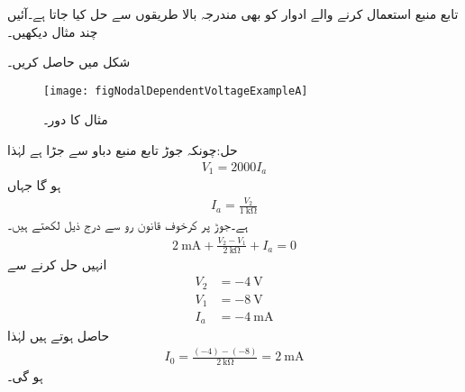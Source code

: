 تابع  منبع استعمال کرنے والے ادوار کو بھی مندرجہ بالا طریقوں سے حل کیا جاتا ہے۔آئیں چند مثال دیکھیں۔

شکل  میں  حاصل کریں۔
\begin{figure}
\centering
\texttt{[image: figNodalDependentVoltageExampleA]}
\caption{مثال  کا دور۔}
\label{شکل_جوڑ_مثال_تابع_منبع_دباو_الف}
\end{figure}

حل:چونکہ جوڑ  تابع منبع دباو سے جڑا ہے لہٰذا
\begin{align*}
V_1=2000 I_a
\end{align*}
ہو گا جہاں
\begin{align*}
I_a=\frac{V_2}{\SI{1}{\kilo\ohm}}
\end{align*}
ہے۔جوڑ  پر کرخوف قانون رو سے درج ذیل لکھتے ہیں۔
\begin{align*}
\SI{2}{\milli\ampere}+\frac{V_2-V_1}{\SI{2}{\kilo\ohm}}+I_a=0
\end{align*}
انہیں حل کرنے سے
\begin{align*}
V_2&=\SI{-4}{\volt}\\
V_1&=\SI{-8}{\volt}\\
I_a&=\SI{-4}{\milli\ampere}
\end{align*}
حاصل ہوتے ہیں لہٰذا
\begin{align*}
I_0=\frac{(-4)-(-8)}{\SI{2}{\kilo\ohm}}=\SI{2}{\milli\ampere}
\end{align*}
ہو گی۔

